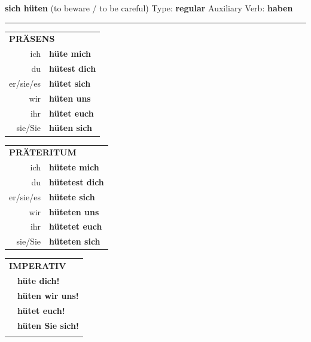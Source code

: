 \documentclass[10pt,a4paper]{revtex4-2}
\begin{document}
\begin{verbbox}
    {\Large \bf sich hüten} (to beware / to be careful) \hfill Type: \textbf{regular} \hfill Auxiliary Verb: \textbf{haben} 
    
     \vspace{5pt}

    \hrule
    
    \vspace{5pt}

  \begin{tabular}{rl}
     \multicolumn{2}{l}{\textbf{PRÄSENS} }\\
    ich & \textbf{hüte mich}\\
    du & \textbf{hütest dich}\\
    er/sie/es & \textbf{hütet sich}\\
    wir & \textbf{hüten uns}\\
    ihr & \textbf{hütet euch}\\
    sie/Sie & \textbf{hüten sich}\\
  \end{tabular}
  \hfill
     \begin{tabular}{rl}
    \multicolumn{2}{l}{\textbf{PRÄTERITUM} }\\
    ich & \textbf{hütete mich}\\
    du & \textbf{hütetest dich}\\
    er/sie/es & \textbf{hütete sich}\\
    wir & \textbf{hüteten uns}\\
    ihr & \textbf{hütetet euch}\\
    sie/Sie & \textbf{hüteten sich}\\
  \end{tabular}
  \hfill
  \begin{tabular}{rl}
     \multicolumn{2}{l}{\textbf{IMPERATIV} }\\
   & \textbf{hüte dich!}\\
   & \textbf{hüten wir uns!}\\
   & \textbf{hütet euch!}\\
   & \textbf{hüten Sie sich!}\\
   & \vspace{10pt}
  \end{tabular}

    \vspace{10pt}


\end{verbbox}
\end{document}
